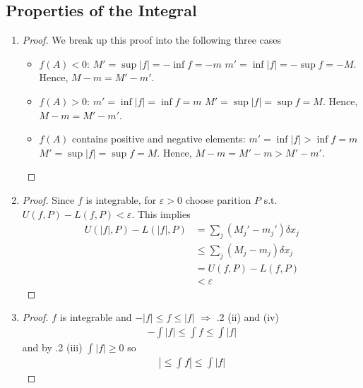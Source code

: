 \subsection{Properties of the Integral}

\begin{enumerate}[label=(\alph*)]
    \item 
    \begin{proof}
        We break up this proof into the following
        three cases
        \begin{itemize}
            \item $f(A)<0$: $M'=\sup |f|=-\inf f=-m$ $m'=\inf |f|=-\sup f=-M$.
            Hence, $M-m=M'-m'$.

            \item $f(A)>0$: $m'=\inf |f|=\inf f=m$ $M'=\sup |f|=\sup f=M$.
            Hence, $M-m=M'-m'$.

            \item $f(A)$ contains positive and negative elements:
            $m'=\inf |f| > \inf f=m$ $M'=\sup |f|=\sup f=M$.
            Hence, $M-m=M'-m>M'-m'$.
        \end{itemize}
    \end{proof}

    \item
    \begin{proof}
        Since $f$ is integrable, for $\varepsilon>0$ 
        choose parition $P$ s.t. 
        $U(f, P)-L(f, P) < \varepsilon$. This implies 
        \begin{align*}
            U(|f|, P)-L(|f|, P) &= \sum_j (M_j'-m_j')\delta x_j \\
            &\leq \sum_j (M_j-m_j)\delta x_j \\
            &= U(f, P)-L(f, P) \\
            &< \varepsilon
        \end{align*}
    \end{proof}

    \item
    \begin{proof}
        $f$ is integrable and $-|f|\leq f\leq |f|$ $\Rightarrow$ .2 (ii)
        and (iv)
        \begin{align*}
            - \int |f| \leq \int f \leq \int |f|
        \end{align*}
        and by .2 (iii) $\int |f|\geq 0$ so 
        \begin{align*}
            |\leq \int f| \leq \int |f|
        \end{align*}
    \end{proof}
\end{enumerate}

